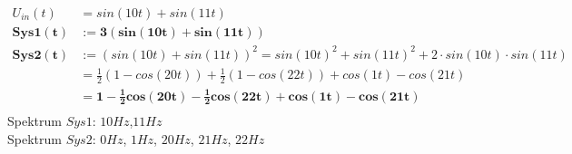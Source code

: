 \documentclass[11pt,a4paper]{scrartcl}
\begin{document}
\begin{math}
\begin{aligned}
U_{in}(t)&=sin(10t)+sin(11t)\\
\bm{Sys1(t)} &\bm{:= 3(sin(10t)+sin(11t))}\\
\bm{Sys2(t)} &\bm{:=} (sin(10t)+sin(11t))^2=sin(10t)^2+sin(11t)^2+2\cdot sin(10t)\cdot sin(11t)
\\&=\frac{1}{2}(1-cos(20t))+\frac{1}{2}(1-cos(22t))+cos(1t)-cos(21t)
\\&=\bm{1-\frac{1}{2}cos(20t)-\frac{1}{2}cos(22t)+cos(1t)-cos(21t)}\\
\end{aligned}
\end{math}\\
Spektrum $Sys1$: $10Hz$,$11Hz$\\
Spektrum $Sys2$: $0Hz$, $1Hz$, $20Hz$, $21Hz$, $22Hz$

\begin{center}
\end{center}
\end{document}
